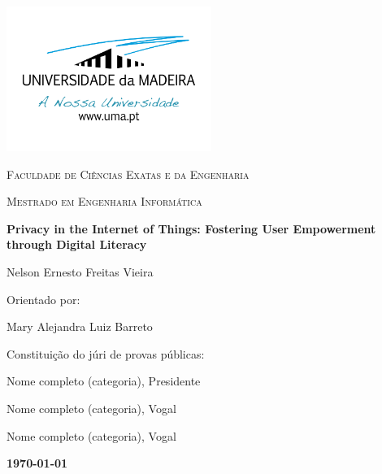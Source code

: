 %
%
\begin{titlepage}
    \centering
    \addtolength{\hoffset}{0.5cm}
    \centering
    \includegraphics[width=0.50\textwidth]{assets/images/uma_logo.png}\par\vspace{0.5cm}
    {\scshape\LARGE {} Faculdade de Ciências Exatas e da Engenharia \par}
    \vspace{1cm}
    {\scshape\Large Mestrado em Engenharia Informática \par}
    \vspace{1.5cm}
    {\huge\bfseries Privacy in the Internet of Things: Fostering User Empowerment through Digital Literacy \par}
    \vspace{2cm}
    {\Large Nelson Ernesto Freitas Vieira\par}
    \vfill
    {\large Orientado por: \par}
        Mary Alejandra Luiz Barreto\par
    \vfill
    {\large Constituição do júri de provas públicas: \par}
        Nome completo (categoria), Presidente \par
        Nome completo (categoria), Vogal \par
        Nome completo (categoria), Vogal \par
    \vfill
    {\large \bfseries \today \par}
\end{titlepage}
